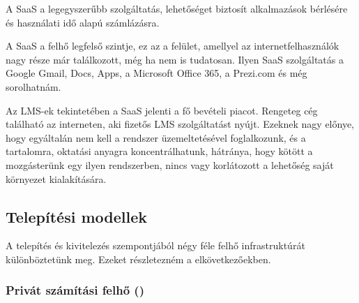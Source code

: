 A SaaS a legegyszerűbb szolgáltatás, lehetőséget biztosít alkalmazások bérlésére és használati idő alapú számlázásra.\cite{ccwlinux}

A SaaS a felhő legfelső szintje, ez az a felület, amellyel az internetfelhasználók nagy része már találkozott, még ha nem is tudatosan. Ilyen SaaS szolgáltatás a Google Gmail, Docs, Apps, a Microsoft Office 365, a Prezi.com és még sorolhatnám.

Az LMS-ek tekintetében a SaaS jelenti a fő bevételi piacot. Rengeteg cég található az interneten, aki fizetős LMS szolgáltatást nyújt. Ezeknek nagy előnye, hogy egyáltalán nem kell a rendszer üzemeltetésével foglalkozunk, és a tartalomra, oktatási anyagra  koncentrálhatunk, hátránya, hogy kötött a mozgásterünk egy ilyen rendszerben, nincs vagy korlátozott a lehetőség saját környezet kialakítására.


\subsection{Telepítési modellek}

A telepítés és kivitelezés szempontjából négy féle felhő infrastruktúrát különböztetünk meg.\cite{nistsp800-145} Ezeket részletezném a elkövetkezőekben.

\subsubsection{Privát számítási felhő ()}

